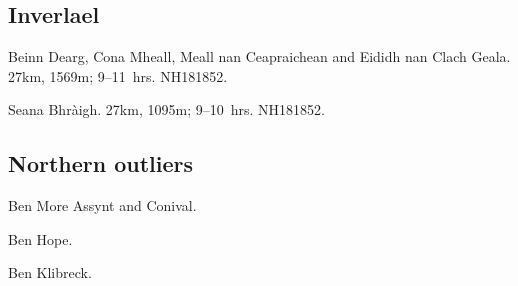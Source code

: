 
\subsection{Inverlael}

\begin{munros}
\item\target
Beinn Dearg, Cona Mheall, Meall nan Ceapraichean and Eididh nan Clach Geala.
27km, 1569m; 9--11~hrs.  NH181852.  \tick

\item\target Seana Bhràigh. 27km, 1095m; 9--10~hrs.  NH181852.  \tick
\end{munros}


\subsection{Northern outliers}

\begin{munros}
\item
Ben More Assynt and Conival.  \tick

\item
Ben Hope.  \tick

\item
Ben Klibreck.  \tick
\end{munros}
